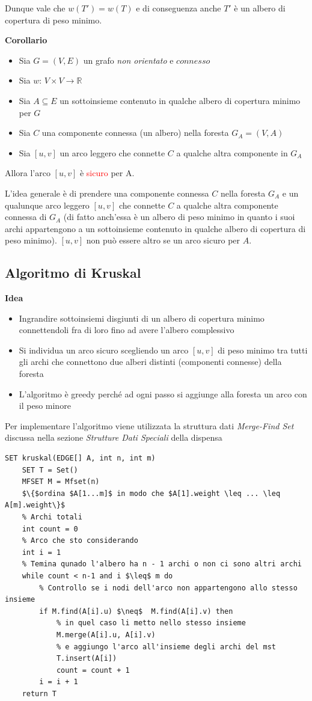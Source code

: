 \documentclass[../cheatSheetAlgoritmi.tex]{subfiles}
\begin{document}
Dunque vale che $w(T') = w(T)$ e di conseguenza anche $T'$ è un albero di copertura di peso minimo.

\bigskip

\textbf{Corollario}
\begin{itemize}
	\item Sia $G = (V, E)$ un grafo \emph{non orientato} e $connesso$
	\item Sia $w$: $V \times V \rightarrow \mathbb{R}$
	\item Sia $A \subseteq E$ un sottoinsieme contenuto in qualche albero di copertura minimo per $G$
	\item Sia $C$ una componente connessa (un albero) nella foresta $G_{A} = (V, A)$
	\item Sia $[u, v]$ un arco leggero che connette $C$ a qualche altra componente in $G_{A}$
\end{itemize}
Allora l'arco $[u, v]$ è \textcolor{red}{sicuro} per A.

\bigskip

L'idea generale è di prendere una componente connessa $C$ nella foresta $G_{A}$ e un qualunque arco leggero $[u, v]$ che connette $C$ a qualche altra componente connessa di $G_{A}$ (di fatto anch'essa è un albero di peso minimo in quanto i suoi archi appartengono a un sottoinsieme contenuto in qualche albero di copertura di peso minimo). $[u, v]$ non può essere altro se un arco sicuro per $A$.
 

\subsection{Algoritmo di Kruskal}
\textbf{Idea}
\begin{itemize}
	\item Ingrandire sottoinsiemi disgiunti di un albero di copertura minimo connettendoli fra di loro fino ad avere l’albero complessivo
	\item Si individua un arco sicuro scegliendo un arco $[u, v]$ di peso minimo tra tutti gli archi che connettono due alberi distinti (componenti connesse) della foresta
	\item L’algoritmo è greedy perché ad ogni passo si aggiunge alla foresta un arco con il peso minore
\end{itemize}
Per implementare l'algoritmo viene utilizzata la struttura dati \emph{Merge-Find Set} discussa nella sezione \emph{Strutture Dati Speciali} della dispensa
\begin{lstlisting}[caption=Albero di Copertura di Peso Minimo - Kruskal]
SET kruskal(EDGE[] A, int n, int m)
	SET T = Set()
	MFSET M = Mfset(n)
	$\{$ordina $A[1...m]$ in modo che $A[1].weight \leq ... \leq A[m].weight\}$
	% Archi totali
	int count = 0
	% Arco che sto considerando
	int i = 1
	% Temina qunado l'albero ha n - 1 archi o non ci sono altri archi
	while count < n-1 and i $\leq$ m do
		% Controllo se i nodi dell'arco non appartengono allo stesso insieme
		if M.find(A[i].u) $\neq$  M.find(A[i].v) then
			% in quel caso li metto nello stesso insieme
			M.merge(A[i].u, A[i].v)
			% e aggiungo l'arco all'insieme degli archi del mst
			T.insert(A[i])
			count = count + 1
		i = i + 1
	return T
\end{lstlisting}
\end{document}
